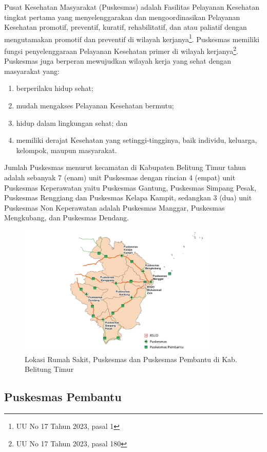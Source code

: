 Pusat Kesehatan Masyarakat (Puskesmas) adalah Fasilitas Pelayanan Kesehatan tingkat pertama yang menyelenggarakan dan mengoordinasikan
Pelayanan Kesehatan promotif, preventif, kuratif, rehabilitatif, dan atau paliatif dengan mengutamakan promotif dan preventif di wilayah kerjanya\footnote{UU No 17 Tahun 2023, pasal 1}. Puskesmas memiliki fungsi penyelenggaraan Pelayanan Kesehatan primer di wilayah kerjanya\footnote{UU No 17 Tahun 2023, pasal 180}. Puskesmas juga berperan mewujudkan wilayah kerja yang sehat dengan masyarakat yang:
\begin{enumerate}[label=\alph*]
	\item berperilaku hidup sehat;
	\item mudah mengakses Pelayanan Kesehatan bermutu;
	\item hidup dalam lingkungan sehat; dan
	\item memiliki derajat Kesehatan yang setinggi-tingginya, baik individu, keluarga, kelompok, maupun masyarakat.
\end{enumerate}

Jumlah Puskesmas menurut kecamatan di Kabupaten Belitung Timur tahun \tP adalah sebanyak 7 (enam) unit Puskesmas dengan rincian 4 (empat) unit Puskesmas Keperawatan yaitu Puskesmas Gantung, Puskesmas Simpang Pesak, Puskesmas Renggiang dan Puskesmas Kelapa Kampit, sedangkan 3 (dua) unit Puskesmas Non Keperawatan adalah Puskesmas Manggar, Puskesmas Mengkubang, dan Puskesmas Dendang.

\begin{figure}[H]
	\centering
	\includegraphics[width=0.85\textwidth]{bab_02/bab_02_01_petaFaskes}	
	\caption{Lokasi Rumah Sakit, Puskesmas dan Puskesmas Pembantu di Kab. Belitung Timur}
	\label{fig:peta-puskesmas-rs}
\end{figure}

\subsection{Puskesmas Pembantu}

